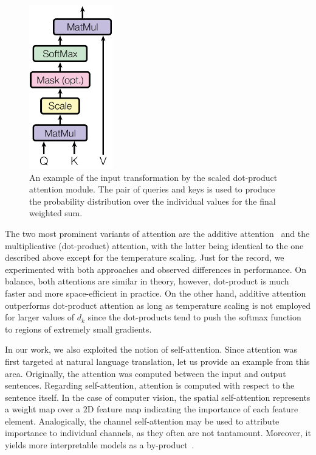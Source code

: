 \begin{figure}[!t]
    \centerline{\includegraphics[width=0.15\linewidth]{figures/siamese_tracking/scaled_dot_product_attention.pdf}}
    \caption[Scaled dot-product attention]{An example of the input transformation by the scaled dot-product attention module. The pair of queries and keys is used to produce the probability distribution over the individual values for the final weighted sum. }
    \label{fig:ScaledDotProductAttention}
\end{figure}

The two most prominent variants of attention are the additive attention~\cite{bahdanau2016additiveattention} and the multiplicative (dot-product) attention, with the latter being identical to the one described above except for the temperature scaling. Just for the record, we experimented with both approaches and observed differences in performance. On balance, both attentions are similar in theory, however, dot-product is much faster and more space-efficient in practice. On the other hand, additive attention outperforms dot-product attention as long as temperature scaling is not employed for larger values of $d_k$ since the dot-products tend to push the softmax function to regions of extremely small gradients.

In our work, we also exploited the notion of self-attention. Since attention was first targeted at natural language translation, let us provide an example from this area. Originally, the attention was computed between the input and output sentences. Regarding self-attention, attention is computed with respect to the sentence itself. In the case of computer vision, the spatial self-attention represents a weight map over a $2$D feature map indicating the importance of each feature element. Analogically, the channel self-attention may be used to attribute importance to individual channels, as they often are not tantamount. Moreover, it yields more interpretable models as a by-product~\cite{vaswani2017attention}.

